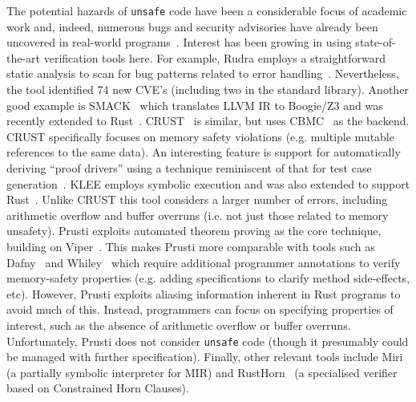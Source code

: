 

The potential hazards of \lstinline{unsafe} code have been a
considerable focus of academic work and, indeed, numerous bugs and
security advisories have already been uncovered in real-world
programs~\cite{BKALK21,XCSZ20}.  Interest has been growing in using
state-of-the-art verification tools here.  For example, Rudra employs
a straightforward static analysis to scan for bug patterns related to
error handling~\cite{BKALK21}.  Nevertheless, the tool identified 74
new CVE's (including two in the standard library).  Another good
example is SMACK~\cite{BCDJL06,MB08} which translates LLVM IR to
Boogie/Z3 and was recently extended to Rust~\cite{BHR18}.
CRUST~\cite{TPT15} is similar, but uses CBMC~\cite{KT14} as the
backend.  CRUST specifically focuses on memory safety violations
(e.g. multiple mutable references to the same data).  An interesting
feature is support for automatically deriving ``proof drivers'' using
a technique reminiscent of that for test case generation~\cite{PE07}.
KLEE employs symbolic execution and was also extended to support
Rust~\cite{LAL18,LFEL19}.  Unlike CRUST this tool considers a larger
number of errors, including arithmetic overflow and buffer overruns
(i.e. not just those related to memory unsafety).  Prusti exploits
automated theorem proving as the core technique, building on
Viper~\cite{AMPS19}.  This makes Prusti more comparable with tools
such as Dafny~\cite{Leino10,Leino12} and Whiley~\cite{Pea15c,UPG17}
which require additional programmer annotations to verify
memory-safety properties (e.g.  adding specifications to clarify
method side-effects, etc).  However, Prusti exploits aliasing
information inherent in Rust programs to avoid much of this.  Instead,
programmers can focus on specifying properties of interest, such as
the absence of arithmetic overflow or buffer overruns.  Unfortunately,
Prusti does not consider \lstinline{unsafe} code (though it presumably
could be managed with further specification).  Finally, other relevant
tools include Miri~\cite{Ols16,JDKJD20} (a partially symbolic
interpreter for MIR) and RustHorn~\cite{MTK20} (a specialised verifier
based on Constrained Horn Clauses).

